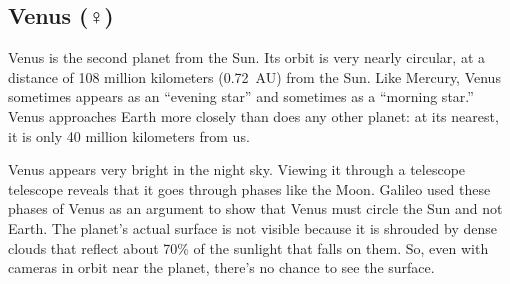 \documentclass{article}
\numberwithin{equation}{section}
\numberwithin{figure}{section}
\begin{document}






\subsection{Venus ($\Venus$)} \label{oSXifU}

Venus is the second planet from the Sun. Its orbit is very nearly circular, at a distance of 108 million kilometers (\SI{0.72}{AU}) from the Sun. Like Mercury, Venus sometimes appears as an ``evening star'' and sometimes as a ``morning star.'' Venus approaches Earth more closely than does any other planet: at its nearest, it is only 40 million kilometers from us.

\vspace{1em}

Venus appears very bright in the night sky. Viewing it through a telescope telescope reveals that it goes through phases like the Moon. Galileo used these phases of Venus as an argument to show that Venus must circle the Sun and not Earth. The planet's actual surface is not visible because it is shrouded by dense clouds that reflect about 70\% of the sunlight that falls on them. So, even with cameras in orbit near the planet, there's no chance to see the surface.
\end{document}
